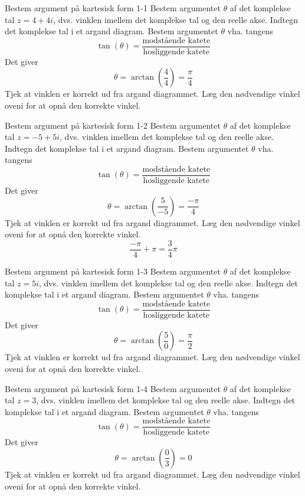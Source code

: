 \documentclass{article}
\begin{document}
\tableofcontents
\newpage
\begin{exercise}{Bestem argument på kartesisk form 1-1}
Bestem argumentet $\theta$ af det komplekse tal $z = 4 + 4i$, dvs. vinklen imellem det komplekse tal og den reelle akse.
\hint
Indtegn det komplekse tal i et argand diagram.
\hint
Bestem argumentet $\theta$ vha. tangens
\[\tan(\theta) = \frac{\textrm{modstående katete}}{\textrm{hosliggende katete}}
\]
\hint
Det giver
\[\theta = \arctan \left(\frac{4}{4}\right) = \frac{\pi}{4}
\]
\hint
Tjek at vinklen er korrekt ud fra argand diagrammet. Læg den nødvendige vinkel oveni for at opnå den korrekte vinkel.
\end{exercise}
\newpage
\begin{exercise}{Bestem argument på kartesisk form 1-2}
Bestem argumentet $\theta$ af det komplekse tal $z = - 5 + 5i$, dvs. vinklen imellem det komplekse tal og den reelle akse.
\hint
Indtegn det komplekse tal i et argand diagram.
\hint
Bestem argumentet $\theta$ vha. tangens
\[\tan(\theta) = \frac{\textrm{modstående katete}}{\textrm{hosliggende katete}}
\]
\hint
Det giver
\[\theta = \arctan \left(\frac{5}{ - 5}\right) = \frac{ - \pi}{4}
\]
\hint
Tjek at vinklen er korrekt ud fra argand diagrammet. Læg den nødvendige vinkel oveni for at opnå den korrekte vinkel.
\[\frac{ - \pi}{4} + \pi = \frac{3}{4} \pi
\]
\end{exercise}
\newpage
\begin{exercise}{Bestem argument på kartesisk form 1-3}
Bestem argumentet $\theta$ af det komplekse tal $z = 5i$, dvs. vinklen imellem det komplekse tal og den reelle akse.
\hint
Indtegn det komplekse tal i et argand diagram.
\hint
Bestem argumentet $\theta$ vha. tangens
\[\tan(\theta) = \frac{\textrm{modstående katete}}{\textrm{hosliggende katete}}
\]
\hint
Det giver
\[\theta = \arctan \left(\frac{5}{0}\right) = \frac{\pi}{2}
\]
\hint
Tjek at vinklen er korrekt ud fra argand diagrammet. Læg den nødvendige vinkel oveni for at opnå den korrekte vinkel.
\end{exercise}
\newpage
\begin{exercise}{Bestem argument på kartesisk form 1-4}
Bestem argumentet $\theta$ af det komplekse tal $z = 3$, dvs. vinklen imellem det komplekse tal og den reelle akse.
\hint
Indtegn det komplekse tal i et argand diagram.
\hint
Bestem argumentet $\theta$ vha. tangens
\[\tan(\theta) = \frac{\textrm{modstående katete}}{\textrm{hosliggende katete}}
\]
\hint
Det giver
\[\theta = \arctan \left(\frac{0}{3}\right) = 0
\]
\hint
Tjek at vinklen er korrekt ud fra argand diagrammet. Læg den nødvendige vinkel oveni for at opnå den korrekte vinkel.
\end{exercise}
\end{document}
